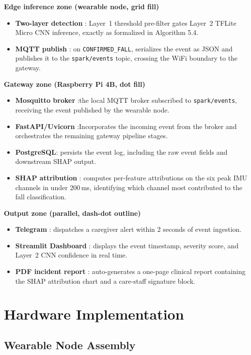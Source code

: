 \textbf{Edge inference zone (wearable node, grid fill)}
\begin{itemize}
	\item \textbf{Two-layer detection} : Layer~1 threshold pre-filter gates Layer~2 TFLite Micro CNN inference, exactly as formalized in Algorithm 5.4.
	\item \textbf{MQTT publish} : on \texttt{CONFIRMED\_FALL}, serializes the event as JSON and publishes it to the \texttt{spark/events} topic, crossing the WiFi boundary to the gateway.
\end{itemize}

\textbf{Gateway zone (Raspberry Pi 4B, dot fill)}
\begin{itemize}
	\item \textbf{Mosquitto broker} :the local MQTT broker subscribed to \texttt{spark/events}, receiving the event published by the wearable node.
	\item \textbf{FastAPI/Uvicorn} :Incorporates the incoming event from the broker and orchestrates the remaining gateway pipeline stages.
	\item \textbf{PostgreSQL}: persists the event log, including the raw event fields and downstream SHAP output.
	\item \textbf{SHAP attribution} : computes per-feature attributions on the six peak IMU channels in under 200\,ms, identifying which channel most contributed to the fall classification.
\end{itemize}

\textbf{Output zone (parallel, dash-dot outline)}
\begin{itemize}
	\item \textbf{Telegram} : dispatches a caregiver alert within 2 seconds of event ingestion.
	\item \textbf{Streamlit Dashboard} : displays the event timestamp, severity score, and Layer~2 CNN confidence in real time.
	\item \textbf{PDF incident report} : auto-generates a one-page clinical report containing the SHAP attribution chart and a care-staff signature block.
\end{itemize}


\section{Hardware Implementation}

\subsection{Wearable Node Assembly}

